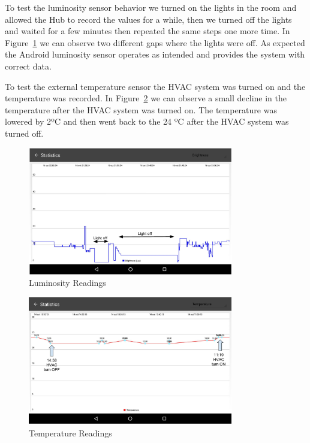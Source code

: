 To test the luminosity sensor behavior we turned on the lights in the room and allowed the Hub to record the values for a while, then we turned off the lights and waited for a few minutes then repeated the same steps one more time. In Figure~\ref{eval:lights} we can observe two different gaps where the lights were off. As expected the Android luminosity sensor operates as intended and provides the system with correct data. 

To test the external temperature sensor the HVAC system was turned on and the temperature was recorded. In Figure~\ref{eval:temp} we can observe a small decline in the temperature after the HVAC system was turned on. The temperature was lowered by 2ºC and then went back to the 24 ºC after the HVAC system was turned off.

\begin{figure}[]
\centering
\includegraphics[width=0.8\textwidth]{Figures/eval_lights}
\caption{Luminosity Readings}
\label{eval:lights}
\end{figure}

\begin{figure}[]
\centering
\includegraphics[width=0.8\textwidth]{Figures/eval_temp}
\caption{Temperature Readings}
\label{eval:temp}
\end{figure}


